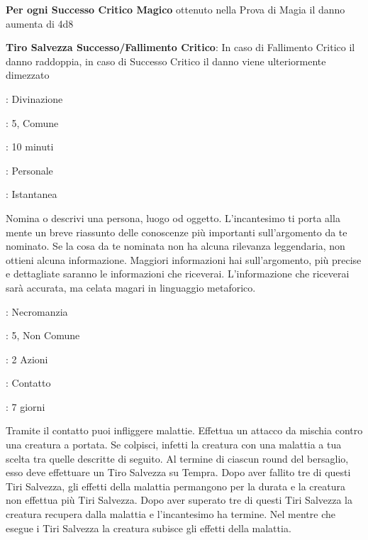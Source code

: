 \begin{multicols}{2}
\textbf{Per ogni Successo Critico Magico} ottenuto nella Prova di Magia il danno aumenta di 4d8

\textbf{Tiro Salvezza Successo/Fallimento Critico}: In caso di Fallimento Critico il danno raddoppia, in caso di Successo Critico il danno viene ulteriormente dimezzato

\noindent\colorbox{OBSSgold!10}{
\begin{minipage}{0.95\linewidth}
\begin{description}[noitemsep, topsep=0pt, parsep=0pt, partopsep=0pt, leftmargin=0cm, labelwidth=1.3cm]
	\item[\textbf{Lista}]: Divinazione
	\item[\textbf{Livello}]: 5, Comune
	\item[\textbf{Lancio}]: 10 minuti
	\item[\textbf{Gittata}]: Personale
	\item[\textbf{Durata}]: Istantanea
\end{description}
\end{minipage}}\smallskip

Nomina o descrivi una persona, luogo od oggetto. L'incantesimo ti porta alla mente un breve riassunto delle conoscenze più importanti sull'argomento da te nominato. Se la cosa da te nominata non ha alcuna rilevanza leggendaria, non ottieni alcuna informazione. Maggiori informazioni hai sull'argomento, più precise e dettagliate saranno le informazioni che riceverai. L'informazione che riceverai sarà accurata, ma celata magari in linguaggio metaforico.

\noindent\colorbox{OBSSgold!10}{
\begin{minipage}{0.95\linewidth}
\begin{description}[noitemsep, topsep=0pt, parsep=0pt, partopsep=0pt, leftmargin=0cm, labelwidth=1.3cm]
	\item[\textbf{Lista}]: Necromanzia
	\item[\textbf{Livello}]: 5, Non Comune
	\item[\textbf{Lancio}]: 2 Azioni
	\item[\textbf{Gittata}]: Contatto
	\item[\textbf{Durata}]: 7 giorni
\end{description}
\end{minipage}}\smallskip

Tramite il contatto puoi infliggere malattie. Effettua un attacco da mischia contro una creatura a portata. Se colpisci, infetti la creatura con una malattia a tua scelta tra quelle descritte di seguito. Al termine di ciascun round del bersaglio, esso deve effettuare un Tiro Salvezza su Tempra. Dopo aver fallito tre di questi Tiri Salvezza, gli effetti della malattia permangono per la durata e la creatura non effettua più Tiri Salvezza. Dopo aver superato tre di questi Tiri Salvezza la creatura recupera dalla malattia e l'incantesimo ha termine. Nel mentre che esegue i Tiri Salvezza la creatura subisce gli effetti della malattia.


\end{multicols}
